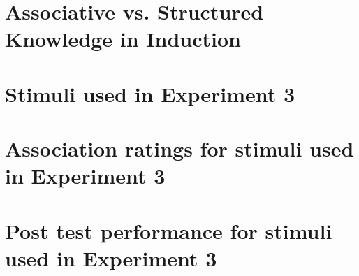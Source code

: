 \documentclass{../Dissertate}
\begin{document}
\doublespacing

\setcounter{chapter}{3} %
\chapter{Associative vs. Structured Knowledge in Induction}











\begin{appendices}

  \appendixpage
  \graphicspath{{./../Appendices/}}
  
  \chapter{Stimuli used in Experiment 3}\label{appendix:exp3_stimuli}
  

  \chapter{Association ratings for stimuli used in Experiment 3}\label{appendix:exp3_associations}
  

  \chapter{Post test performance for stimuli used in Experiment 3}\label{appendix:exp3_posttest}
  


\end{appendices}
\end{document}
